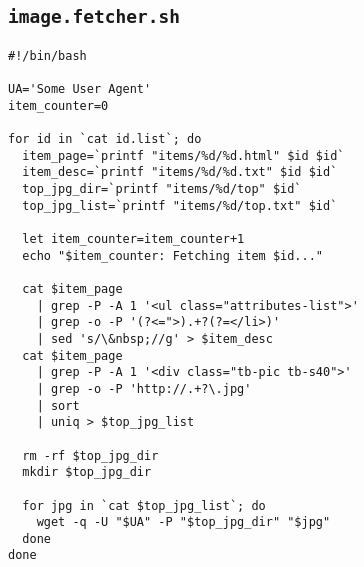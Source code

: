 \subsection{\tt image.fetcher.sh}
\begin{verbatim}
#!/bin/bash

UA='Some User Agent'
item_counter=0

for id in `cat id.list`; do
  item_page=`printf "items/%d/%d.html" $id $id`
  item_desc=`printf "items/%d/%d.txt" $id $id`
  top_jpg_dir=`printf "items/%d/top" $id`
  top_jpg_list=`printf "items/%d/top.txt" $id`

  let item_counter=item_counter+1
  echo "$item_counter: Fetching item $id..."

  cat $item_page
    | grep -P -A 1 '<ul class="attributes-list">'
    | grep -o -P '(?<=">).+?(?=</li>)'
    | sed 's/\&nbsp;//g' > $item_desc
  cat $item_page
    | grep -P -A 1 '<div class="tb-pic tb-s40">'
    | grep -o -P 'http://.+?\.jpg'
    | sort
    | uniq > $top_jpg_list

  rm -rf $top_jpg_dir
  mkdir $top_jpg_dir

  for jpg in `cat $top_jpg_list`; do
    wget -q -U "$UA" -P "$top_jpg_dir" "$jpg"
  done
done
\end{verbatim}
